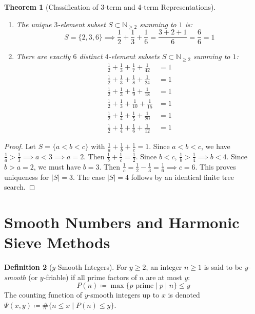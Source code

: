 \documentclass[11pt,a4paper]{article}
\newtheorem{theorem}{Theorem}[section]
\theoremstyle{definition}
\newtheorem{definition}[theorem]{Definition}
\begin{document}
\begin{theorem}[Classification of 3-term and 4-term Representations]\label{thm:class_3_4}
\begin{enumerate}
    \item The unique $3$-element subset $S \subset \mathbb{N}_{\ge 2}$ summing to $1$ is:
    \begin{equation}\label{eq:sum_3}
    S = \{2, 3, 6\} \implies \frac{1}{2} + \frac{1}{3} + \frac{1}{6} = \frac{3 + 2 + 1}{6} = \frac{6}{6} = 1
    \end{equation}
    \item There are exactly $6$ distinct $4$-element subsets $S \subset \mathbb{N}_{\ge 2}$ summing to $1$:
    \begin{align}
    \frac{1}{2} + \frac{1}{3} + \frac{1}{7} + \frac{1}{42} &= 1 \label{eq:sum_4_1} \\
    \frac{1}{2} + \frac{1}{3} + \frac{1}{8} + \frac{1}{24} &= 1 \label{eq:sum_4_2} \\
    \frac{1}{2} + \frac{1}{3} + \frac{1}{9} + \frac{1}{18} &= 1 \label{eq:sum_4_3} \\
    \frac{1}{2} + \frac{1}{3} + \frac{1}{10} + \frac{1}{15} &= 1 \label{eq:sum_4_4} \\
    \frac{1}{2} + \frac{1}{4} + \frac{1}{5} + \frac{1}{20} &= 1 \label{eq:sum_4_5} \\
    \frac{1}{2} + \frac{1}{4} + \frac{1}{6} + \frac{1}{12} &= 1 \label{eq:sum_4_6}
    \end{align}
\end{enumerate}
\end{theorem}

\begin{proof}
Let $S = \{a < b < c\}$ with $\frac{1}{a} + \frac{1}{b} + \frac{1}{c} = 1$.
Since $a < b < c$, we have $\frac{1}{a} > \frac{1}{3} \implies a < 3 \implies a = 2$.
Then $\frac{1}{b} + \frac{1}{c} = \frac{1}{2}$.
Since $b < c$, $\frac{1}{b} > \frac{1}{4} \implies b < 4$.
Since $b > a = 2$, we must have $b = 3$.
Then $\frac{1}{c} = \frac{1}{2} - \frac{1}{3} = \frac{1}{6} \implies c = 6$.
This proves uniqueness for $|S| = 3$. The case $|S| = 4$ follows by an identical finite tree search.
\end{proof}

\section{Smooth Numbers and Harmonic Sieve Methods}

\begin{definition}[$y$-Smooth Integers]\label{def:smooth}
For $y \ge 2$, an integer $n \ge 1$ is said to be \emph{$y$-smooth} (or $y$-friable) if all prime factors of $n$ are at most $y$:
\begin{equation}\label{eq:smooth_def}
P(n) \coloneqq \max \{ p \text{ prime} \mid p \mid n \} \le y
\end{equation}
The counting function of $y$-smooth integers up to $x$ is denoted $\Psi(x, y) \coloneqq \#\{n \le x \mid P(n) \le y\}$.
\end{definition}
\end{document}
